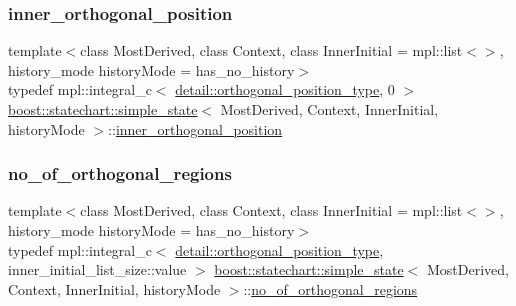 \subsubsection{\texorpdfstring{inner\+\_\+orthogonal\+\_\+position}{inner\_orthogonal\_position}}
{\footnotesize\ttfamily template$<$class Most\+Derived, class Context, class Inner\+Initial = mpl\+::list$<$$>$, history\+\_\+mode history\+Mode = has\+\_\+no\+\_\+history$>$ \\
typedef mpl\+::integral\+\_\+c$<$ \mbox{\hyperlink{namespaceboost_1_1statechart_1_1detail_a3bedea0b807a16fa222733417183d2c9}{detail\+::orthogonal\+\_\+position\+\_\+type}}, 0 $>$ \mbox{\hyperlink{classboost_1_1statechart_1_1simple__state}{boost\+::statechart\+::simple\+\_\+state}}$<$ Most\+Derived, Context, Inner\+Initial, history\+Mode $>$\+::\mbox{\hyperlink{classboost_1_1statechart_1_1simple__state_a8b829f6ba90355ad7ea32d9dcc7e09ad}{inner\+\_\+orthogonal\+\_\+position}}}

\mbox{\label{classboost_1_1statechart_1_1simple__state_abee09a2cb17ed7db5457d3f09bb75f9c}} 
\subsubsection{\texorpdfstring{no\+\_\+of\+\_\+orthogonal\+\_\+regions}{no\_of\_orthogonal\_regions}}
{\footnotesize\ttfamily template$<$class Most\+Derived, class Context, class Inner\+Initial = mpl\+::list$<$$>$, history\+\_\+mode history\+Mode = has\+\_\+no\+\_\+history$>$ \\
typedef mpl\+::integral\+\_\+c$<$ \mbox{\hyperlink{namespaceboost_1_1statechart_1_1detail_a3bedea0b807a16fa222733417183d2c9}{detail\+::orthogonal\+\_\+position\+\_\+type}}, inner\+\_\+initial\+\_\+list\+\_\+size\+::value $>$ \mbox{\hyperlink{classboost_1_1statechart_1_1simple__state}{boost\+::statechart\+::simple\+\_\+state}}$<$ Most\+Derived, Context, Inner\+Initial, history\+Mode $>$\+::\mbox{\hyperlink{classboost_1_1statechart_1_1simple__state_abee09a2cb17ed7db5457d3f09bb75f9c}{no\+\_\+of\+\_\+orthogonal\+\_\+regions}}}

\mbox{\label{classboost_1_1statechart_1_1simple__state_af97b00e4ff6f12a1045beb57687cf9bc}} 
